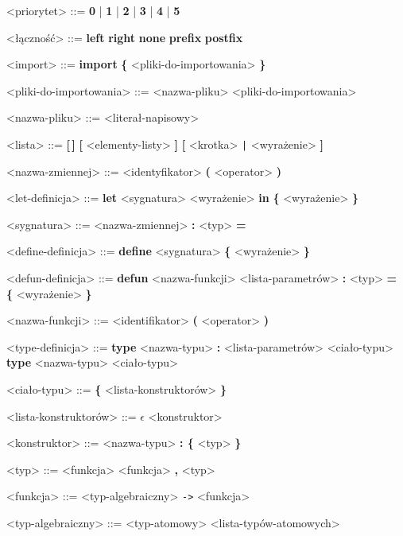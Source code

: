 \documentclass[12pt]{article}
\begin{document}
\begin{grammar}
<priorytet> ::=
    \textbf{0} | \textbf{1} | \textbf{2} | \textbf{3} | \textbf{4} | \textbf{5}

<łączność> ::=
    \textbf{left}
    \alt \textbf{right}
    \alt \textbf{none}
    \alt \textbf{prefix}
    \alt \textbf{postfix}

<import> ::=
    \textbf{import} \textbf{\{} <pliki-do-importowania> \textbf{\}}

<pliki-do-importowania> ::=
    <nazwa-pliku>
     <pliki-do-importowania>

<nazwa-pliku> ::=
    <literał-napisowy>


<lista> ::=
    \textbf{[\,]}
    \alt \textbf{[} <elementy-listy> \textbf{]}
    \alt \textbf{[} <krotka> \texttt{|} <wyrażenie> \textbf{]}

<nazwa-zmiennej> ::=
    <identyfikator>
    \alt \textbf{(} <operator> \textbf{)}

<let-definicja> ::=
    \textbf{let} <sygnatura> <wyrażenie>
    \textbf{in} \textbf{\{} <wyrażenie> \textbf{\}} 

<sygnatura> ::=
    <nazwa-zmiennej> \textbf{:} <typ> \textbf{=}

<define-definicja> ::=
    \textbf{define} <sygnatura> \textbf{\{} <wyrażenie> \textbf{\}}

<defun-definicja> ::=
    \textbf{defun} <nazwa-funkcji> <lista-parametrów> \textbf{:} <typ> 
    \textbf{= \{} <wyrażenie> \textbf{\}}

<nazwa-funkcji> ::=
    <identifikator>
    \alt \textbf{(} <operator> \textbf{)}

<type-definicja> ::=
    \textbf{type} <nazwa-typu> 
    \textbf{:} <lista-parametrów> <ciało-typu>
    \alt \textbf{type} <nazwa-typu> <ciało-typu>

<ciało-typu> ::= 
    \textbf{\{} <lista-konstruktorów> \textbf{\}}

<lista-konstruktorów> ::=
    $\epsilon$
     <konstruktor>

<konstruktor> ::=
    <nazwa-typu>
     \textbf{: \{} <typ> \textbf{\}}
    
<typ> ::=
    <funkcja>
    \alt <funkcja> \textbf{,} <typ>

<funkcja> ::= 
    <typ-algebraiczny>
     \texttt{->} <funkcja>

<typ-algebraiczny> ::=
    <typ-atomowy>
     <lista-typów-atomowych>


\end{grammar}
\end{document}
